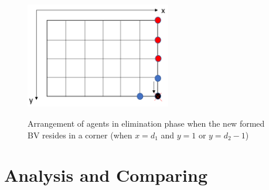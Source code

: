 \begin{itemize}
\begin{figure} [H]
{    \includegraphics[width=2.5in]{figures/meshcorner4.png}}
    \caption{Arrangement of agents in elimination phase when the new formed BV resides in a corner (when $x=d_1$ and $y=1$ or $y=d_2-1$)} 
  \label{fig:subfigmesh4} %
\end{figure}
\end{itemize}

\section{Analysis and Comparing}
